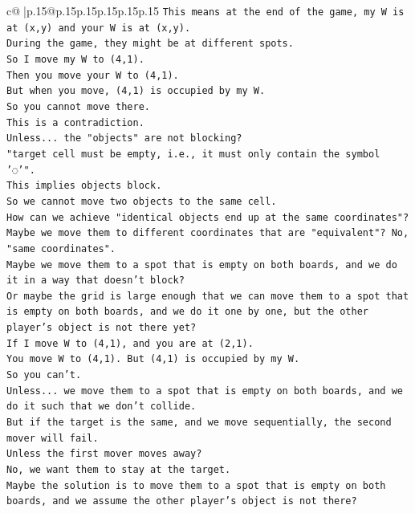 \documentclass{article}
\begin{document}
{\begin{supertabular}{c@{$\;$}|p{.15\linewidth}@{}p{.15\linewidth}p{.15\linewidth}p{.15\linewidth}p{.15\linewidth}p{.15\linewidth}}
{{{\texttt{This means at the end of the game, my W is at (x,y) and your W is at (x,y).} \\
\texttt{During the game, they might be at different spots.} \\
\texttt{So I move my W to (4,1).} \\
\texttt{Then you move your W to (4,1).} \\
\texttt{But when you move, (4,1) is occupied by my W.} \\
\texttt{So you cannot move there.} \\
\texttt{This is a contradiction.} \\
\texttt{Unless... the "objects" are not blocking?} \\
\texttt{"target cell must be empty, i.e., it must only contain the symbol '◌'".} \\
\texttt{This implies objects block.} \\
\texttt{So we cannot move two objects to the same cell.} \\
\texttt{How can we achieve "identical objects end up at the same coordinates"?} \\
\texttt{Maybe we move them to different coordinates that are "equivalent"? No, "same coordinates".} \\
\texttt{Maybe we move them to a spot that is empty on both boards, and we do it in a way that doesn't block?} \\
\texttt{Or maybe the grid is large enough that we can move them to a spot that is empty on both boards, and we do it one by one, but the other player's object is not there yet?} \\
\texttt{If I move W to (4,1), and you are at (2,1).} \\
\texttt{You move W to (4,1). But (4,1) is occupied by my W.} \\
\texttt{So you can't.} \\
\texttt{Unless... we move them to a spot that is empty on both boards, and we do it such that we don't collide.} \\
\texttt{But if the target is the same, and we move sequentially, the second mover will fail.} \\
\texttt{Unless the first mover moves away?} \\
\texttt{No, we want them to stay at the target.} \\
\texttt{Maybe the solution is to move them to a spot that is empty on both boards, and we assume the other player's object is not there?} \\
}}}
\end{supertabular}}
\end{document}
